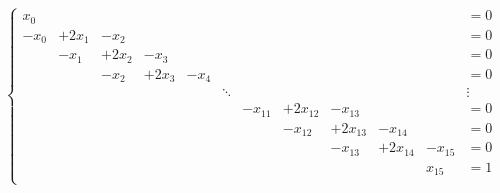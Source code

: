 \documentclass[notitlepage]{report}
\begin{document}
\begin{equation}
\nonumber
\left\{
\begin{array}{cccccccccccl}
 x_0 &       &       &       &      &        &         &          &          &          &         &= 0 \\
-x_0 & +2x_1 & -x_2  &       &      &        &         &          &          &          &         &= 0 \\
     & -x_1  & +2x_2 & -x_3  &      &        &         &          &          &          &         &= 0 \\
     &       & -x_2  & +2x_3 & -x_4 &        &         &          &          &          &         &= 0 \\
     &       &       &       &      & \ddots &         &          &          &          &         &  \vdots \\
     &       &       &       &      &        & -x_{11} & +2x_{12} & -x_{13}  &          &         &= 0 \\
     &       &       &       &      &        &         & -x_{12}  & +2x_{13} & -x_{14}  &         &= 0 \\
     &       &       &       &      &        &         &          & -x_{13}  & +2x_{14} & -x_{15} &= 0 \\
     &       &       &       &      &        &         &          &          &          &  x_{15} &= 1 \\
\end{array}
\right.
\end{equation}
\end{document}
